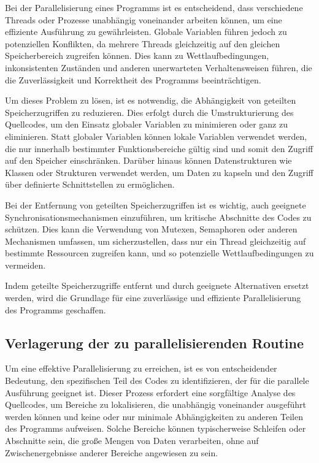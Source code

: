 Bei der Parallelisierung eines Programms ist es entscheidend, dass verschiedene Threads oder Prozesse unabhängig voneinander arbeiten können, um eine effiziente Ausführung zu gewährleisten. Globale Variablen führen jedoch zu potenziellen Konflikten, da mehrere Threads gleichzeitig auf den gleichen Speicherbereich zugreifen können. Dies kann zu Wettlaufbedingungen, inkonsistenten Zuständen und anderen unerwarteten Verhaltensweisen führen, die die Zuverlässigkeit und Korrektheit des Programms beeinträchtigen.

Um dieses Problem zu lösen, ist es notwendig, die Abhängigkeit von geteilten Speicherzugriffen zu reduzieren. Dies erfolgt durch die Umstrukturierung des Quellcodes, um den Einsatz globaler Variablen zu minimieren oder ganz zu eliminieren. Statt globaler Variablen können lokale Variablen verwendet werden, die nur innerhalb bestimmter Funktionsbereiche gültig sind und somit den Zugriff auf den Speicher einschränken. Darüber hinaus können Datenstrukturen wie Klassen oder Strukturen verwendet werden, um Daten zu kapseln und den Zugriff über definierte Schnittstellen zu ermöglichen.

Bei der Entfernung von geteilten Speicherzugriffen ist es wichtig, auch geeignete Synchronisationsmechanismen einzuführen, um kritische Abschnitte des Codes zu schützen. Dies kann die Verwendung von Mutexen, Semaphoren oder anderen Mechanismen umfassen, um sicherzustellen, dass nur ein Thread gleichzeitig auf bestimmte Ressourcen zugreifen kann, und so potenzielle Wettlaufbedingungen zu vermeiden.

Indem geteilte Speicherzugriffe entfernt und durch geeignete Alternativen ersetzt werden, wird die Grundlage für eine zuverlässige und effiziente Parallelisierung des Programms geschaffen.

\subsection{Verlagerung der zu parallelisierenden Routine}
\label{sec:Verlagerung_parallelisierende_Routine}
Um eine effektive Parallelisierung zu erreichen, ist es von entscheidender Bedeutung, den spezifischen Teil des Codes zu identifizieren, der für die parallele Ausführung geeignet ist. Dieser Prozess erfordert eine sorgfältige Analyse des Quellcodes, um Bereiche zu lokalisieren, die unabhängig voneinander ausgeführt werden können und keine oder nur minimale Abhängigkeiten zu anderen Teilen des Programms aufweisen. Solche Bereiche können typischerweise Schleifen oder Abschnitte sein, die große Mengen von Daten verarbeiten, ohne auf Zwischenergebnisse anderer Bereiche angewiesen zu sein.

